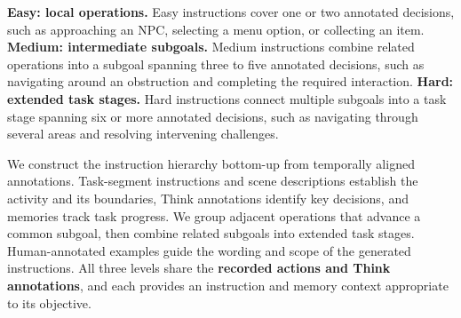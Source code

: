 \textbf{Easy: local operations.}
Easy instructions cover one or two annotated decisions, such as approaching an NPC, selecting a menu option, or collecting an item. \textbf{Medium: intermediate subgoals.} Medium instructions combine related operations into a subgoal spanning three to five annotated decisions, such as navigating around an obstruction and completing the required interaction. \textbf{Hard: extended task stages.} Hard instructions connect multiple subgoals into a task stage spanning six or more annotated decisions, such as navigating through several areas and resolving intervening challenges.

We construct the instruction hierarchy bottom-up from temporally aligned annotations. Task-segment instructions and scene descriptions establish the activity and its boundaries, Think annotations identify key decisions, and memories track task progress. We group adjacent operations that advance a common subgoal, then combine related subgoals into extended task stages. Human-annotated examples guide the wording and scope of the generated instructions. All three levels share the \textbf{recorded actions and Think annotations}, and each provides an instruction and memory context appropriate to its objective.

